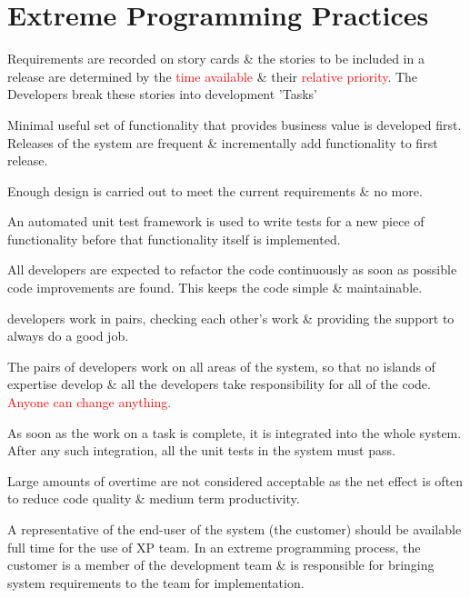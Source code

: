 \documentclass{report}
\newcommand{\textr}[1]{\textcolor{red}{#1}}
\begin{document}
\section{Extreme Programming Practices}
\begin{description}[style=multiline,leftmargin=12em]
  \item [Incremental planning] Requirements are recorded on story cards \& the stories to be included in a release are determined by the \textr{time available} \& their \textr{relative priority}. The Developers break these stories into development 'Tasks'
    \item [Small releases] Minimal useful set of functionality that provides business value is developed first.\newline
    Releases of the system are frequent \& incrementally add functionality to first release.
  \item [Simple design] Enough design is carried out to meet the current requirements \& no more.
  \item [Test-first development] An automated unit test framework is used to write tests for a new piece of functionality before that functionality itself is implemented.
  \item [Refactoring] All developers are expected to refactor the code continuously as soon as possible code improvements are found. This keeps the code simple \& maintainable.
  \item [Pair programming] developers work in pairs, checking each other's work \& providing the support to always do a good job.
  \item [Collective ownership] The pairs of developers work on all areas of the system, so that no islands of expertise develop \& all the developers take responsibility for all of the code. \textr{Anyone can change anything.}
  \item [Continuous integration] As soon as the work on a task is complete, it is integrated into the whole system. After any such integration, all the unit tests in the system must pass.
  \item [Sustainable pace] Large amounts of overtime are not considered acceptable as the net effect is often to reduce code quality \& medium term productivity.
  \item [On-site customer] A representative of the end-user of the system (the customer) should be available full time for the use of XP team. In an extreme programming process, the customer is a member of the development team \& is responsible for bringing system requirements to the team for implementation.
\end{description}
\end{document}
